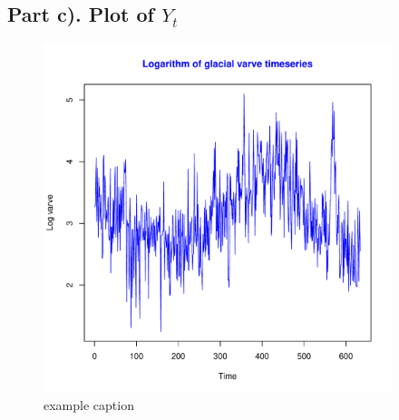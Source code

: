 \documentclass[11pt, oneside]{article}   	%
\begin{document}
\subsection{Part c). Plot of $Y_{t}$}
\begin{figure}[H] %
   \centering
   \includegraphics[width=4in]{var_sample_plot} 
   \caption{example caption}
   \label{fig:example}
\end{figure}

\end{document}
